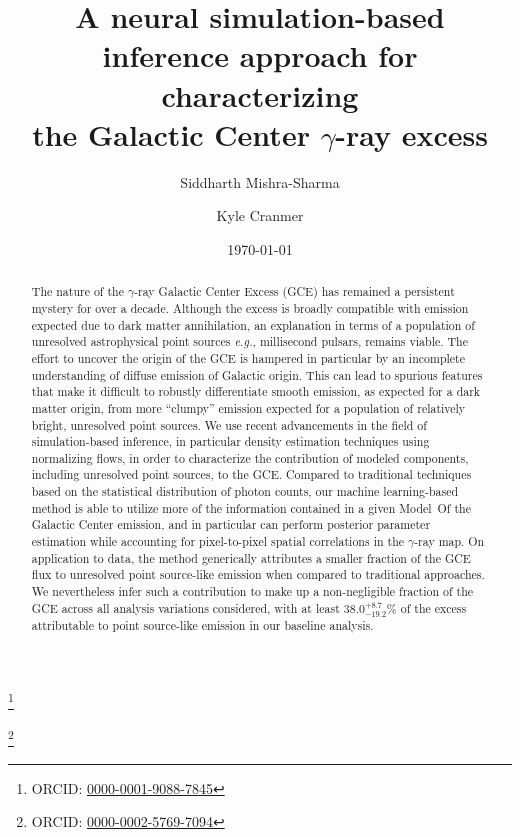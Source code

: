 \documentclass[prd,aps,10pt,nofootinbib,twocolumn,superscriptaddress,preprintnumbers,balancelastpage,longbibliography,floatfix]{revtex4-2}
\begin{document}

\title{A neural simulation-based inference approach for characterizing \\ the Galactic Center $\gamma$-ray excess}

\author{Siddharth Mishra-Sharma}
\thanks{ORCID: \href{https://orcid.org/0000-0001-9088-7845}{0000-0001-9088-7845}}

\author{Kyle Cranmer}
\thanks{ORCID: \href{https://orcid.org/0000-0002-5769-7094}{0000-0002-5769-7094}}

\date{\today}

\begin{abstract}
The nature of the \Fermi $\gamma$-ray Galactic Center Excess (GCE) has remained a persistent mystery for over a decade. Although the excess is broadly compatible with emission expected due to dark matter annihilation, an explanation in terms of a population of unresolved astrophysical point sources \emph{e.g.}, millisecond pulsars, remains viable. The effort to uncover the origin of the GCE is hampered in particular by an incomplete understanding of diffuse emission of Galactic origin. This can lead to spurious features that make it difficult to robustly differentiate smooth emission, as expected for a dark matter origin, from more ``clumpy'' emission expected for a population of relatively bright, unresolved point sources. We use recent advancements in the field of simulation-based inference, in particular density estimation techniques using normalizing flows, in order to characterize the contribution of modeled components, including unresolved point sources, to the GCE. Compared to traditional techniques based on the statistical distribution of photon counts, our machine learning-based method is able to utilize more of the information contained in a given {Model~O}f the Galactic Center emission, and in particular can perform posterior parameter estimation while accounting for pixel-to-pixel spatial correlations in the $\gamma$-ray map. On application to \Fermi data, the method generically attributes a smaller fraction of the GCE flux to unresolved point source-like emission when compared to traditional approaches. We nevertheless infer such a contribution to make up a non-negligible fraction of the GCE across all analysis variations considered, with at least $38.0^{+8.7}_{-19.2}\%$ of the excess attributable to point source-like emission in our baseline analysis.
\end{abstract}
\end{document}
